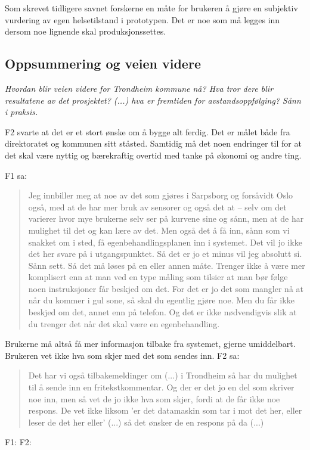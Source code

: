 Som skrevet tidligere savnet forskerne en måte for brukeren å gjøre en subjektiv vurdering av egen helsetilstand i prototypen. Det er noe
som må legges inn dersom noe lignende skal produksjonssettes.

\subsection{Oppsummering og veien videre}
\textit{Hvordan blir veien videre for Trondheim kommune nå? Hva tror dere blir resultatene av det prosjektet? (...) hva er fremtiden for
avstandsoppfølging? Sånn i praksis.}

F2 svarte at det er et stort ønske om å bygge alt ferdig. Det er målet både fra direktoratet og kommunen sitt ståsted. Samtidig må det noen
endringer til for at det skal være nyttig og bærekraftig overtid med tanke på økonomi og andre ting.

F1 sa:
\blockquote{Jeg innbiller meg at noe av det som gjøres i Sarpsborg og forsåvidt Oslo også, med at de har mer bruk av sensorer og også det at -- selv om det varierer hvor
    mye brukerne selv ser på kurvene sine og sånn, men at de har mulighet til det og kan lære av det. Men også det å få inn, sånn som vi snakket om i sted, få
    egenbehandlingsplanen inn i systemet. Det vil jo ikke det her svare på i utgangspunktet. Så det er jo et minus vil jeg absolutt si. Sånn sett. Så det må løses på en
    eller annen måte. Trenger ikke å være mer komplisert enn at man ved en type måling som tilsier at man bør følge noen instruksjoner får beskjed om det. For det er jo
    det som mangler nå at når du kommer i gul sone, så skal du egentlig gjøre noe. Men du får ikke beskjed om det, annet enn på telefon. Og det er ikke nødvendigvis slik
at du trenger det når det skal være en egenbehandling.}

Brukerne må altså få mer informasjon tilbake fra systemet, gjerne umiddelbart. Brukeren vet ikke hva som skjer med det som sendes inn.
F2 sa:
\blockquote{Det har vi også tilbakemeldinger om (...) i Trondheim så har du mulighet til å sende inn en fritekstkommentar. Og der er det jo en del som skriver
    noe inn, men så vet de jo ikke hva som skjer, fordi at de får ikke noe respons. De vet ikke liksom 'er det datamaskin som tar i mot det her, eller leser de det her
eller' (...) så det ønsker de en respons på da (...)}

F1:  \newline
F2: 


